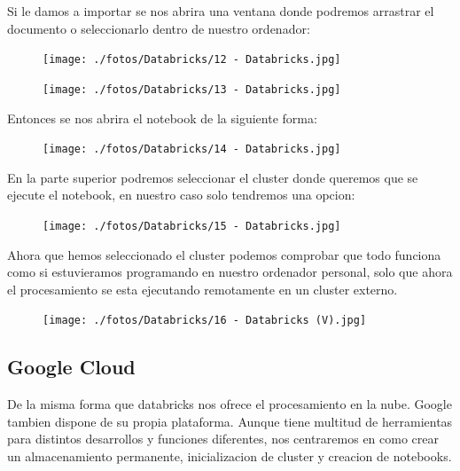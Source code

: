 \documentclass[a4paper,10pt]{article}
\begin{document}
Si le damos a importar se nos abrira una ventana donde podremos arrastrar el documento o seleccionarlo dentro de nuestro ordenador:

\begin{figure}[H]
\begin{center}
\texttt{[image: ./fotos/Databricks/12 - Databricks.jpg]}
\end{center}
\end{figure}

\begin{figure}[H]
\begin{center}
\texttt{[image: ./fotos/Databricks/13 - Databricks.jpg]}
\end{center}
\end{figure}

Entonces se nos abrira el notebook de la siguiente forma:

\begin{figure}[H]
\begin{center}
\texttt{[image: ./fotos/Databricks/14 - Databricks.jpg]}
\end{center}
\end{figure}

En la parte superior podremos seleccionar el cluster donde queremos que se ejecute el notebook, en nuestro caso solo tendremos una opcion:

\begin{figure}[H]
\begin{center}
\texttt{[image: ./fotos/Databricks/15 - Databricks.jpg]}
\end{center}
\end{figure}

Ahora que hemos seleccionado el cluster podemos comprobar que todo funciona como si estuvieramos programando en nuestro ordenador personal, solo que ahora el procesamiento se esta ejecutando remotamente en un cluster externo.

\begin{figure}[H]
\begin{center}
\texttt{[image: ./fotos/Databricks/16 - Databricks (V).jpg]}
\end{center}
\end{figure}

\clearpage

\subsection{Google Cloud}

De la misma forma que databricks nos ofrece el procesamiento en la nube. Google tambien dispone de su propia plataforma. Aunque tiene multitud de herramientas para distintos desarrollos y funciones diferentes, nos centraremos en como crear un almacenamiento permanente, inicializacion de cluster y creacion de notebooks.
\end{document}
